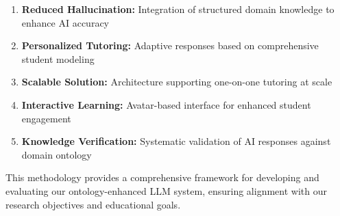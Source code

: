 \begin{enumerate}
    \item \textbf{Reduced Hallucination:} Integration of structured domain knowledge to enhance AI accuracy 
    \item \textbf{Personalized Tutoring:} Adaptive responses based on comprehensive student modeling
    \item \textbf{Scalable Solution:} Architecture supporting one-on-one tutoring at scale
    \item \textbf{Interactive Learning:} Avatar-based interface for enhanced student engagement
    \item \textbf{Knowledge Verification:} Systematic validation of AI responses against domain ontology 
\end{enumerate}

This methodology provides a comprehensive framework for developing and evaluating our ontology-enhanced LLM system, ensuring alignment with our research objectives and educational goals. 